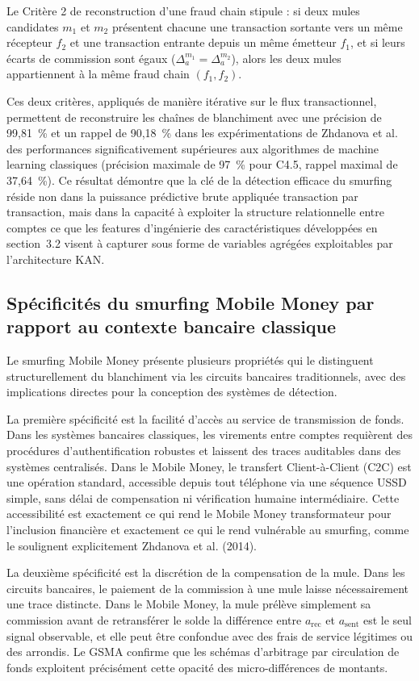 \documentclass[11pt,a4paper,oneside]{report}
\theoremstyle{definition}
\theoremstyle{remark}
\begin{document}
Le Critère 2 de reconstruction d'une fraud chain stipule : si deux mules candidates $m_1$ et $m_2$ présentent chacune une transaction sortante vers un même récepteur $f_2$ et une transaction entrante depuis un même émetteur $f_1$, et si leurs écarts de commission sont égaux ($\Delta_a^{m_1} = \Delta_a^{m_2}$), alors les deux mules appartiennent à la même fraud chain $(f_1, f_2)$.

Ces deux critères, appliqués de manière itérative sur le flux transactionnel, permettent de reconstruire les chaînes de blanchiment avec une précision de 99,81~\% et un rappel de 90,18~\% dans les expérimentations de Zhdanova et al.  des performances significativement supérieures aux algorithmes de machine learning classiques (précision maximale de 97~\% pour C4.5, rappel maximal de 37,64~\%). Ce résultat démontre que la clé de la détection efficace du smurfing réside non dans la puissance prédictive brute appliquée transaction par transaction, mais dans la capacité à exploiter la structure relationnelle entre comptes  ce que les features d'ingénierie des caractéristiques développées en section~3.2 visent à capturer sous forme de variables agrégées exploitables par l'architecture KAN.

\subsection{Spécificités du smurfing Mobile Money par rapport au contexte bancaire classique}

Le smurfing Mobile Money présente plusieurs propriétés qui le distinguent structurellement du blanchiment via les circuits bancaires traditionnels, avec des implications directes pour la conception des systèmes de détection.

La première spécificité est la facilité d'accès au service de transmission de fonds. Dans les systèmes bancaires classiques, les virements entre comptes requièrent des procédures d'authentification robustes et laissent des traces auditables dans des systèmes centralisés. Dans le Mobile Money, le transfert Client-à-Client (C2C) est une opération standard, accessible depuis tout téléphone via une séquence USSD simple, sans délai de compensation ni vérification humaine intermédiaire. Cette accessibilité est exactement ce qui rend le Mobile Money transformateur pour l'inclusion financière  et exactement ce qui le rend vulnérable au smurfing, comme le soulignent explicitement Zhdanova et al. (2014).

La deuxième spécificité est la discrétion de la compensation de la mule. Dans les circuits bancaires, le paiement de la commission à une mule laisse nécessairement une trace distincte. Dans le Mobile Money, la mule prélève simplement sa commission avant de retransférer le solde  la différence entre $a_{\text{rec}}$ et $a_{\text{sent}}$ est le seul signal observable, et elle peut être confondue avec des frais de service légitimes ou des arrondis. Le GSMA confirme que les schémas d'arbitrage par circulation de fonds exploitent précisément cette opacité des micro-différences de montants.
\end{document}
